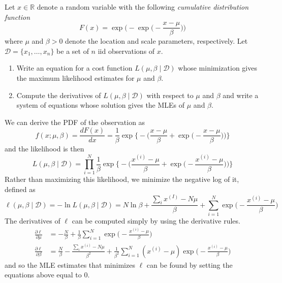 \documentclass{article}
\begin{document}
  \begin{exercise}
    Let $x \in \mathbb{R}$ denote a random variable with the following \textit{cumulative distribution function} 
    \begin{equation}
      F(x) = \exp \bigg( - \exp \bigg( - \frac{x - \mu}{\beta} \bigg) \bigg)
    \end{equation}
    where $\mu$ and $\beta > 0$ denote the location and scale parameters, respectively. Let $\mathcal{D} = \{x_1, \ldots, x_n\}$ be a set of $n$ iid observations of $x$. 
    \begin{enumerate}
      \item Write an equation for a cost function $L(\mu, \beta \mid \mathcal{D})$ whose minimization gives the maximum likelihood estimates for $\mu$ and $\beta$. 
      \item Compute the derivatives of $L(\mu, \beta \mid \mathcal{D})$ with respect to $\mu$ and $\beta$ and write a system of equations whose solution gives the MLEs of $\mu$ and $\beta$. 
    \end{enumerate}
  \end{exercise}
  \begin{solution}
    We can derive the PDF of the observation as 
    \begin{equation}
      f(x; \mu, \beta) = \frac{d F(x)}{dx} = \frac{1}{\beta} \exp \bigg\{ - \bigg( \frac{x - \mu}{\beta} + \exp \Big( - \frac{x - \mu}{\beta}\Big) \bigg) \bigg\}
    \end{equation}
    and the likelihood is then 
    \begin{equation}
      L(\mu, \beta \mid \mathcal{D}) = \prod_{i=1}^N \frac{1}{\beta} \exp \bigg\{ - \bigg( \frac{x^{(i)} - \mu}{\beta} + \exp \Big( - \frac{x^{(i)} - \mu}{\beta}\Big) \bigg) \bigg\}
    \end{equation}
    Rather than maximizing this likelihood, we minimize the negative log of it, defined as 
    \begin{equation}
      \ell(\mu, \beta \mid \mathcal{D}) = - \ln L(\mu, \beta \mid \mathcal{D}) = N \ln{\beta} + \frac{\sum_{i} x^{(I)} - N \mu}{\beta} + \sum_{i=1}^N \exp \Big( - \frac{x^{(i)} - \mu}{\beta} \Big)
    \end{equation}
    The derivatives of $\ell$ can be computed simply by using the derivative rules.  
    \begin{align}
      \frac{\partial \ell}{\partial \mu} & = - \frac{N}{\beta} + \frac{1}{\beta} \sum_{i=1}^N \exp \Big( - \frac{x^{(i)} - \mu}{\beta} \Big) \\
      \frac{\partial \ell}{\partial \beta} & = \frac{N}{\beta} - \frac{\sum_{i} x^{(i)} - N \mu}{\beta^2} + \frac{1}{\beta^2} \sum_{i=1}^N (x^{(i)} - \mu) \exp \Big( - \frac{x^{(i)} - \mu}{\beta} \Big)
    \end{align}
    and so the MLE estimates that minimizes $\ell$ can be found by setting the equations above equal to $0$. 
  \end{solution}
\end{document}
